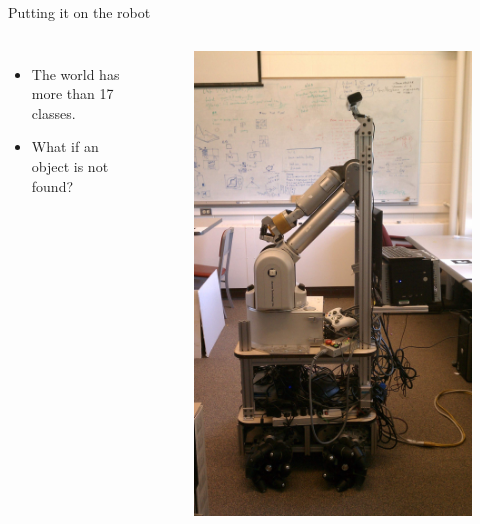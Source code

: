 \documentclass{beamer}
\begin{document}
\begin{frame}{Putting it on the robot}

\begin{columns}
\begin{itemize}
\item The world has more than 17 classes.
\item What if an object is not found?
\end{itemize}
 \begin{figure}   
\includegraphics[width=\linewidth]{robot2.jpg}
 \end{figure}

\end{columns}

\end{frame}
\end{document}
